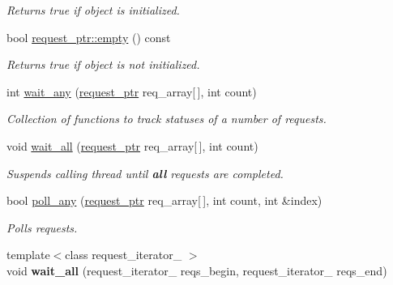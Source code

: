 \begin{CompactItemize}
\begin{CompactList}\small\item\em Returns true if object is initialized. \item\end{CompactList}\item 
\hypertarget{group__iolayer_g41b7141c1c672fac687ab81ce5438017}{
bool \hyperlink{group__iolayer_g41b7141c1c672fac687ab81ce5438017}{request\_\-ptr::empty} () const }
\label{group__iolayer_g41b7141c1c672fac687ab81ce5438017}

\begin{CompactList}\small\item\em Returns true if object is not initialized. \item\end{CompactList}\item 
int \hyperlink{group__iolayer_g7a455713cd840b099075368af3f30ff5}{wait\_\-any} (\hyperlink{classrequest__ptr}{request\_\-ptr} req\_\-array\mbox{[}$\,$\mbox{]}, int count)
\begin{CompactList}\small\item\em Collection of functions to track statuses of a number of requests. \item\end{CompactList}\item 
void \hyperlink{group__iolayer_g06afc14fe71f0a16bb7c4e607c546a2d}{wait\_\-all} (\hyperlink{classrequest__ptr}{request\_\-ptr} req\_\-array\mbox{[}$\,$\mbox{]}, int count)
\begin{CompactList}\small\item\em Suspends calling thread until {\bf all} requests are completed. \item\end{CompactList}\item 
bool \hyperlink{group__iolayer_gcc646374095debeec8ade492b695ad37}{poll\_\-any} (\hyperlink{classrequest__ptr}{request\_\-ptr} req\_\-array\mbox{[}$\,$\mbox{]}, int count, int \&index)
\begin{CompactList}\small\item\em Polls requests. \item\end{CompactList}\item 
\hypertarget{group__iolayer_gd401ad947b79641c7087adc8b783948f}{
{\footnotesize template$<$class request\_\-iterator\_\- $>$ }\\void \textbf{wait\_\-all} (request\_\-iterator\_\- reqs\_\-begin, request\_\-iterator\_\- reqs\_\-end)}
\label{group__iolayer_gd401ad947b79641c7087adc8b783948f}


\end{CompactItemize}
